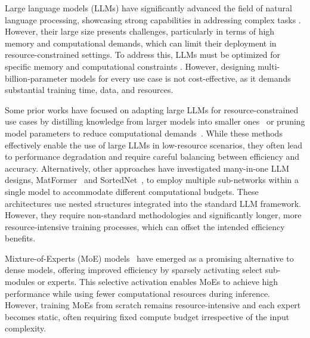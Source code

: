 


 Large language models (LLMs) have significantly advanced the field of natural language processing, showcasing strong capabilities in addressing complex tasks \cite{LLM1, LLM2_LLama, LLM3_Wei2022ChainOT}. However, their large size presents challenges, particularly in terms of high memory and computational demands, which can limit their deployment in resource-constrained settings. To address this, LLMs must be optimized for specific memory and computational constraints \cite{Touvron2023Llama2O}. However, designing multi-billion-parameter models for every use case is not cost-effective, as it demands substantial training time, data, and resources.

Some prior works have focused on adapting large LLMs for resource-constrained use cases by distilling knowledge from larger models into smaller ones~\citep{hsieh-etal-2023-distilling} or pruning model parameters to reduce computational demands~\citep{sun2024a}. While these methods effectively enable the use of large LLMs in low-resource scenarios, they often lead to performance degradation and require careful balancing between efficiency and accuracy. Alternatively, other approaches have investigated many-in-one LLM designs, MatFormer~\citep{Devvrit2023MatFormerNT} and SortedNet~\citep{Sortednet}, to employ multiple sub-networks within a single model to accommodate different computational budgets. These architectures use nested structures integrated into the standard LLM framework. However, they require non-standard methodologies and significantly longer, more resource-intensive training processes, which can offset the intended efficiency benefits.

Mixture-of-Experts (MoE) models~\citep{shazeer2017,Du2021GLaMES,fedus_switch,zoph2022st,he2024mixture} have emerged as a promising alternative to dense models, offering improved efficiency by sparsely activating select sub-modules or experts. This selective activation enables MoEs to achieve high performance while using fewer computational resources during inference. However, training MoEs from scratch remains resource-intensive and each expert becomes static, often requiring fixed compute budget irrespective of the input complexity.

